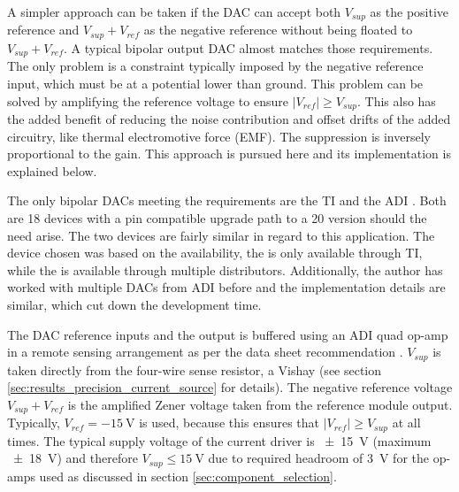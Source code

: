 A simpler approach can be taken if the DAC can accept both $V_{sup}$ as the positive reference and $V_{sup} + V_{ref}$ as the negative reference without being floated to $V_{sup} + V_{ref}$. A typical bipolar output DAC almost matches those requirements. The only problem is a constraint typically imposed by the negative reference input, which must be at a potential lower than ground. This problem can be solved by amplifying the reference voltage to ensure $\left|V_{ref}\right| \geq V_{sup}$. This also has the added benefit of reducing the noise contribution and offset drifts of the added circuitry, like thermal electromotive force (EMF). The suppression is inversely proportional to the gain. This approach is pursued here and its implementation is explained below.

The only bipolar DACs meeting the requirements are the TI  \cite{datasheet_DAC91001} and the ADI  \cite{datasheet_AD5781}. Both are \qty{18}{\bit} devices with a pin compatible upgrade path to a \qty{20}{\bit} version should the need arise. The two devices are fairly similar in regard to this application. The device chosen was based on the availability, the  is only available through TI, while the  is available through multiple distributors. Additionally, the author has worked with multiple DACs from ADI before and the implementation details are similar, which cut down the development time.

The DAC reference inputs and the output is buffered using an ADI  quad op-amp in a remote sensing arrangement as per the data sheet recommendation \cite{datasheet_AD5781}. $V_{sup}$ is taken directly from the four-wire sense resistor, a Vishay  (see section \ref{sec:results_precision_current_source} for details). The negative reference voltage $V_{sup} + V_{ref}$ is the amplified Zener voltage taken from the reference module output. Typically, $V_{ref} = \qty{-15}{\V}$ is used, because this ensures that $\left|V_{ref}\right| \geq V_{sup}$ at all times. The typical supply voltage of the current driver is \qty{\pm 15}{\V} (maximum \qty{\pm 18}{\V}) and therefore $V_{sup} \leq \qty{15}{\V}$ due to required headroom of \qty{3}{\V} for the op-amps used as discussed in section \ref{sec:component_selection}.

